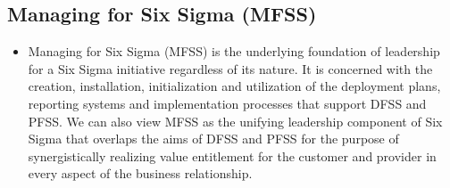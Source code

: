 \documentclass[11pt]{article} %
\begin{document}
\subsection{Managing for Six Sigma (MFSS)}
\begin{itemize}
\item Managing for Six Sigma (MFSS) is the underlying foundation of leadership for a Six Sigma initiative regardless of its nature.  It is concerned with the creation, installation, initialization and utilization of the deployment plans, reporting systems and implementation processes that support DFSS and PFSS.  We can also view MFSS as the unifying leadership component of Six Sigma that overlaps the aims of DFSS and PFSS for the purpose of synergistically realizing value entitlement for the customer and provider in every aspect of the business relationship.
\end{itemize}
\end{document}
